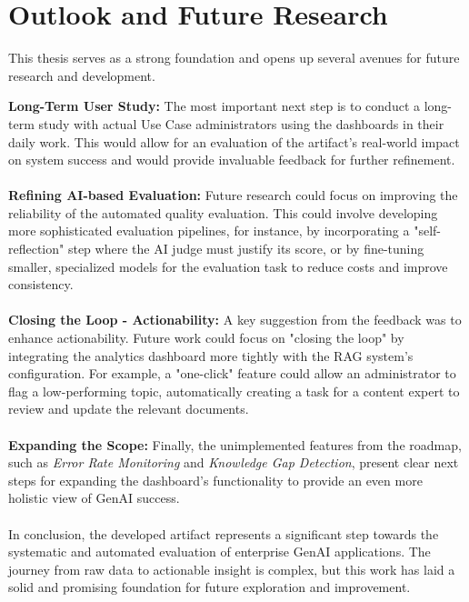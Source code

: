 \documentclass[
	english,
	ruledheaders=section,%
	class=report,%
	thesis={type=bachelor},%
	accentcolor=1b,%
	custommargins=true,%
	marginpar=false,%
	parskip=half-,%
	fontsize=11pt,%
	DIV=14,
]{tudapub}
\begin{document}
\section{Outlook and Future Research}
This thesis serves as a strong foundation and opens up several avenues for future research and development.

\textbf{Long-Term User Study:} The most important next step is to conduct a long-term study with actual Use Case administrators using the dashboards in their daily work. This would allow for an evaluation of the artifact's real-world impact on system success and would provide invaluable feedback for further refinement.\\
\\
\textbf{Refining AI-based Evaluation:} Future research could focus on improving the reliability of the automated quality evaluation. This could involve developing more sophisticated evaluation pipelines, for instance, by incorporating a "self-reflection" step where the AI judge must justify its score, or by fine-tuning smaller, specialized models for the evaluation task to reduce costs and improve consistency.\\
\\
\textbf{Closing the Loop - Actionability:} A key suggestion from the feedback was to enhance actionability. Future work could focus on "closing the loop" by integrating the analytics dashboard more tightly with the RAG system's configuration. For example, a "one-click" feature could allow an administrator to flag a low-performing topic, automatically creating a task for a content expert to review and update the relevant documents.\\
\\
\textbf{Expanding the Scope:} Finally, the unimplemented features from the roadmap, such as \textit{Error Rate Monitoring} and \textit{Knowledge Gap Detection}, present clear next steps for expanding the dashboard's functionality to provide an even more holistic view of GenAI success.\\
\\
In conclusion, the developed artifact represents a significant step towards the systematic and automated evaluation of enterprise GenAI applications. The journey from raw data to actionable insight is complex, but this work has laid a solid and promising foundation for future exploration and improvement.

\end{document}
